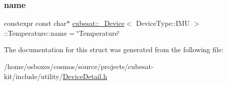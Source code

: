 \subsubsection{\texorpdfstring{name}{name}}
{\footnotesize\ttfamily constexpr const char$\ast$ \hyperlink{structcubesat_1_1__Device}{cubesat\+::\+\_\+\+Device}$<$ Device\+Type\+::\+I\+MU $>$\+::Temperature\+::name = \char`\"{}Temperature\char`\"{}\hspace{0.3cm}{\ttfamily [static]}}



The documentation for this struct was generated from the following file\+:\begin{DoxyCompactItemize}
\item 
/home/osboxes/cosmos/source/projects/cubesat-\/kit/include/utility/\hyperlink{DeviceDetail_8h}{Device\+Detail.\+h}\end{DoxyCompactItemize}
